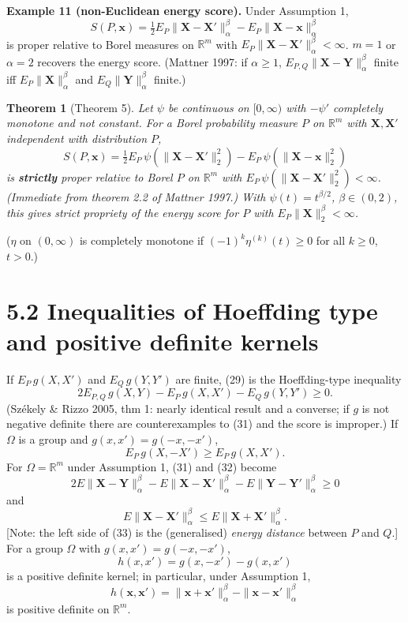 \documentclass{article}
\newtheorem{theorem}{Theorem}
\newcommand{\1}{\mathbb{1}}
\newcommand{\R}{\mathbb{R}}
\newcommand{\bx}{\mathbf{x}}
\newcommand{\bX}{\mathbf{X}}
\newcommand{\bY}{\mathbf{Y}}
\begin{document}
\noindent\textbf{Example 11 (non-Euclidean energy score).} Under Assumption 1,
\[
  S(P,\bx) = \tfrac12 E_P\|\bX-\bX'\|_\alpha^\beta - E_P\|\bX-\bx\|_\alpha^\beta
\]
is proper relative to Borel measures on $\R^m$ with $E_P\|\bX-\bX'\|_\alpha^\beta<\infty$.
$m=1$ or $\alpha=2$ recovers the energy score. (Mattner 1997: if $\alpha\ge1$,
$E_{P,Q}\|\bX-\bY\|_\alpha^\beta$ finite iff $E_P\|\bX\|_\alpha^\beta$ and
$E_Q\|\bY\|_\alpha^\beta$ finite.)

\begin{theorem}[Theorem 5]
Let $\psi$ be continuous on $[0,\infty)$ with $-\psi'$ completely monotone and
not constant. For a Borel probability measure $P$ on $\R^m$ with $\bX,\bX'$
independent with distribution $P$,
\[
  S(P,\bx) = \tfrac12 E_P\,\psi(\|\bX-\bX'\|_2^2) - E_P\,\psi(\|\bX-\bx\|_2^2)
\]
is \textbf{strictly} proper relative to Borel $P$ on $\R^m$ with
$E_P\,\psi(\|\bX-\bX'\|_2^2)<\infty$. (Immediate from theorem 2.2 of Mattner
1997.) With $\psi(t)=t^{\beta/2}$, $\beta\in(0,2)$, this gives strict propriety
of the energy score for $P$ with $E_P\|\bX\|_2^\beta<\infty$.
\end{theorem}
($\eta$ on $(0,\infty)$ is completely monotone if $(-1)^k\eta^{(k)}(t)\ge0$ for
all $k\ge0$, $t>0$.)

\section*{5.2 Inequalities of Hoeffding type and positive definite kernels}
If $E_P\,g(X,X')$ and $E_Q\,g(Y,Y')$ are finite, (29) is the Hoeffding-type
inequality
\begin{equation}\tag{31}
  2E_{P,Q}\,g(X,Y) - E_P\,g(X,X') - E_Q\,g(Y,Y') \ge 0 .
\end{equation}
(Sz\'ekely \& Rizzo 2005, thm 1: nearly identical result and a converse; if $g$
is not negative definite there are counterexamples to (31) and the score is
improper.) If $\Omega$ is a group and $g(x,x')=g(-x,-x')$,
\begin{equation}\tag{32}
  E_P\,g(X,-X') \ge E_P\,g(X,X').
\end{equation}
For $\Omega=\R^m$ under Assumption 1, (31) and (32) become
\begin{equation}\tag{33}
  2E\|\bX-\bY\|_\alpha^\beta - E\|\bX-\bX'\|_\alpha^\beta - E\|\bY-\bY'\|_\alpha^\beta \ge 0
\end{equation}
and
\begin{equation}\tag{34}
  E\|\bX-\bX'\|_\alpha^\beta \le E\|\bX+\bX'\|_\alpha^\beta .
\end{equation}
[Note: the left side of (33) is the (generalised) \emph{energy distance}
between $P$ and $Q$.] For a group $\Omega$ with $g(x,x')=g(-x,-x')$,
\begin{equation}\tag{35}
  h(x,x') = g(x,-x') - g(x,x')
\end{equation}
is a positive definite kernel; in particular, under Assumption 1,
\begin{equation}\tag{36}
  h(\bx,\bx') = \|\bx+\bx'\|_\alpha^\beta - \|\bx-\bx'\|_\alpha^\beta
\end{equation}
is positive definite on $\R^m$.
\end{document}
